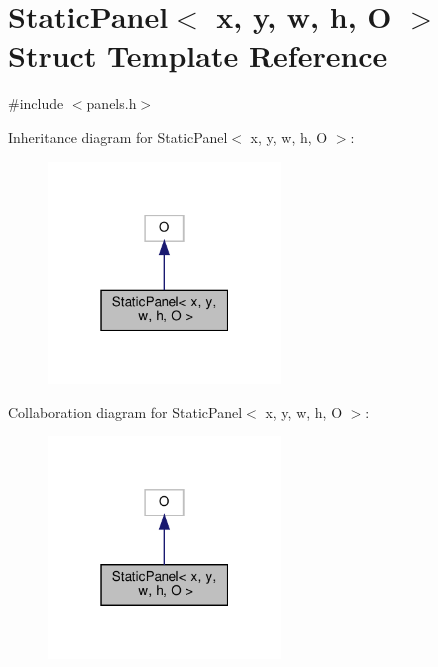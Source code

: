 \hypertarget{structStaticPanel}{}\section{Static\+Panel$<$ x, y, w, h, O $>$ Struct Template Reference}
\label{structStaticPanel}


{\ttfamily \#include $<$panels.\+h$>$}



Inheritance diagram for Static\+Panel$<$ x, y, w, h, O $>$\+:\nopagebreak
\begin{figure}[H]
\begin{center}
\leavevmode
\includegraphics[width=175pt]{structStaticPanel__inherit__graph}
\end{center}
\end{figure}


Collaboration diagram for Static\+Panel$<$ x, y, w, h, O $>$\+:\nopagebreak
\begin{figure}[H]
\begin{center}
\leavevmode
\includegraphics[width=175pt]{structStaticPanel__coll__graph}
\end{center}
\end{figure}

